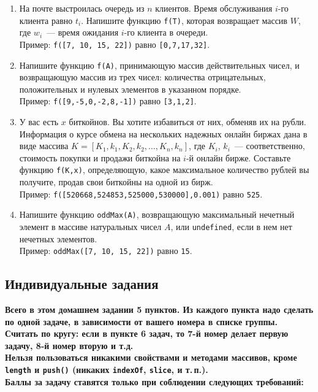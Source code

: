 \documentclass{article}
\begin{document}
\begin{enumerate}[label=0.\theenumi.]
\item 
На почте выстроилась очередь из $n$ клиентов. Время обслуживания $i$-го клиента равно $t_i$. Напишите функцию \texttt{f(T)}, которая возвращает массив $W$, где  $w_i$~--- время ожидания $i$-го клиента в очереди.
\\Пример: \texttt{f([7, 10, 15, 22])} равно \texttt{[0,7,17,32]}.

\item 
Напишите функцию \texttt{f(A)}, принимающую массив действительных чисел, и возвращающую массив из трех чисел: количества отрицательных, положительных и нулевых элементов в указанном порядке. 
\\Пример: \texttt{f([9,-5,0,-2,8,-1])} равно \texttt{[3,1,2]}.

\item 
У вас есть $x$ биткойнов. Вы хотите избавиться от них, обменяв их на рубли. Информация о курсе обмена на нескольких надежных онлайн биржах дана в виде массива $K = [K_1,k_1,K_2,k_2,\ldots,K_n,k_n]$, где $K_i$, $k_i$~--- соответственно, стоимость покупки и продажи биткойна на $i$-й онлайн бирже. Составьте функцию \texttt{f(K,x)}, определяющую, какое максимальное количество рублей вы получите, продав свои биткойны на одной из бирж.
\\Пример: \texttt{f([520668,524853,525000,530000],0.001)} равно \texttt{525}.

\item 
Напишите функцию \texttt{oddMax(A)}, возвращающую максимальный нечетный элемент в массиве натуральных чисел $A$, или \texttt{undefined}, если в нем нет нечетных элементов.
\\Пример: \texttt{oddMax([7, 10, 15, 22])} равно \texttt{15}.
\end{enumerate}

\newpage

\begin{center}
\subsection*{Индивидуальные задания}
\end{center}

\noindent \textbf{Всего в этом домашнем задании 5 пунктов. Из каждого пункта надо сделать по одной задаче, в зависимости от вашего номера в списке группы. Считать по кругу: если в пункте 6 задач, то 7-й номер делает первую задачу, 8-й номер вторую и т.д.}
{
    \color{red}
    \bf
    \\[1.5mm]
    Нельзя пользоваться никакими свойствами и методами массивов, кроме \texttt{length} и \texttt{push()} (никаких \texttt{indexOf}, \texttt{slice}, и т.\,п.).
    \\[1.5mm]
    Баллы за задачу ставятся только при соблюдении следующих требований:
}
\end{document}

